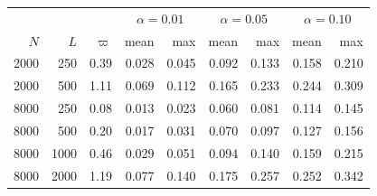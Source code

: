 \begin{tabular}{rr r rr rr rr}\toprule
 & & & \multicolumn{2}{c}{$\alpha=0.01$} & \multicolumn{2}{c}{$\alpha=0.05$} & \multicolumn{2}{c}{$\alpha=0.10$} \\
$N$ & $L$ & $\varpi$ & mean & max & mean & max & mean & max \\\midrule
2000 & 250 & 0.39 & 0.028 & 0.045 & 0.092 & 0.133 & 0.158 & 0.210 \\
2000 & 500 & 1.11 & 0.069 & 0.112 & 0.165 & 0.233 & 0.244 & 0.309 \\
8000 & 250 & 0.08 & 0.013 & 0.023 & 0.060 & 0.081 & 0.114 & 0.145 \\
8000 & 500 & 0.20 & 0.017 & 0.031 & 0.070 & 0.097 & 0.127 & 0.156 \\
8000 & 1000 & 0.46 & 0.029 & 0.051 & 0.094 & 0.140 & 0.159 & 0.215 \\
8000 & 2000 & 1.19 & 0.077 & 0.140 & 0.175 & 0.257 & 0.252 & 0.342 \\
\bottomrule\end{tabular}
